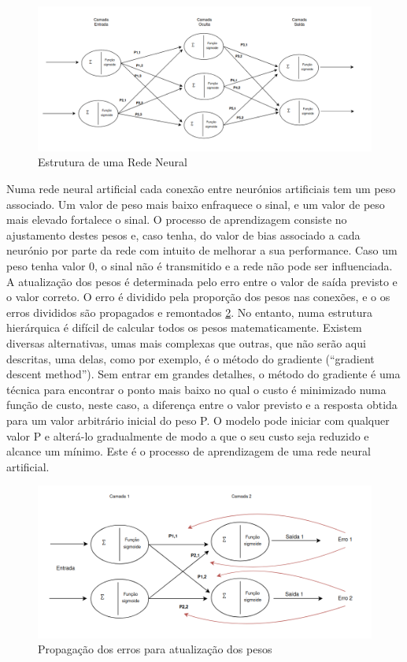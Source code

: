 \begin{figure}[H]
\centering
\includegraphics[scale=0.42]{figs/redeNeuralDraw}
\caption{Estrutura de uma Rede Neural}\label{ANN}
\end{figure}



Numa rede neural artificial cada conexão entre neurónios artificiais tem um peso associado. Um valor de peso mais baixo enfraquece o sinal, e um valor de peso mais elevado fortalece o sinal. O processo de aprendizagem consiste no ajustamento destes pesos e, caso tenha, do valor de bias associado a cada neurónio por parte da rede com intuito de melhorar a sua performance. Caso um peso tenha valor 0, o sinal não é transmitido e a rede não pode ser influenciada. A atualização dos pesos é determinada pelo erro entre o valor de saída previsto e o valor correto. O erro é dividido pela proporção dos pesos nas conexões, e o os erros divididos são propagados e remontados \ref{propagaçao}. No entanto, numa estrutura hierárquica é difícil de calcular todos os pesos matematicamente. Existem diversas alternativas, umas mais complexas que outras, que não serão aqui descritas, uma delas, como por exemplo, é o método do gradiente (``gradient descent method''). Sem entrar em grandes detalhes, o método do gradiente é uma técnica para encontrar o ponto mais baixo no qual o custo é minimizado numa função de custo, neste caso, a diferença entre o valor previsto e a resposta obtida para um valor arbitrário inicial do peso P. O modelo pode iniciar com qualquer valor P e alterá-lo gradualmente de modo a que o seu custo seja reduzido e alcance um mínimo. Este é o processo de aprendizagem de uma rede neural artificial.


\begin{figure}[H]
\centering
\includegraphics[scale=0.42]{figs/propagação}
\caption{Propagação dos erros para atualização dos pesos}\label{propagaçao}
\end{figure}




